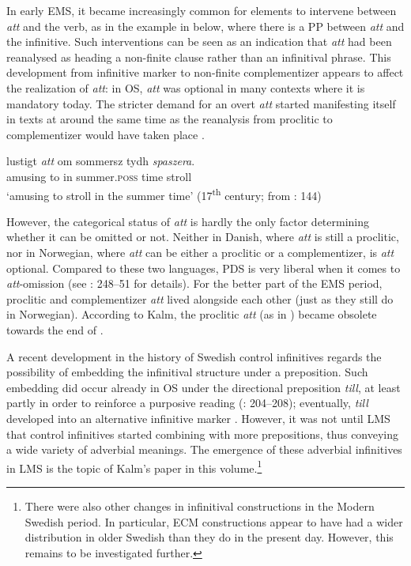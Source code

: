 \documentclass[output=paper]{langscibook}
\begin{document}
In early EMS, it became increasingly common for elements to intervene between \textit{att} and the verb, as in the example in  below, where there is a PP between \textit{att} and the infinitive. Such interventions can be seen as an indication that \textit{att} had been reanalysed as heading a non-finite clause rather than an infinitival phrase. This development from infinitive marker to non-finite complementizer appears to affect the realization of \textit{att}: in OS, \textit{att} was optional in many contexts where it is mandatory today. The stricter demand for an overt \textit{att} started manifesting itself in texts at around the same time as the reanalysis from proclitic to complementizer would have taken place \citep[35]{Falk2010Studier}.


\ea \label{ex:intro:11}
\gll  lustigt \textit{att} om     sommersz     tydh \textit{spaszera}. \\
  amusing  to   in   summer.\textsc{poss}  time  stroll\\
\glt ‘amusing to stroll in the summer time’ (17\textsuperscript{th} century; from \citealt{Kalm2016Satsekvivalenta}: 144)
\z


However, the categorical status of \textit{att} is hardly the only factor determining whether it can be omitted or not. Neither in Danish, where \textit{att} is still a proclitic, nor in Norwegian, where \textit{att} can be either a proclitic or a complementizer, is \textit{att} optional. Compared to these two languages, PDS is very liberal when it comes to \textit{att}{}-omission (see \citealt{Faarlund2019}: 248–51 for details). For the better part of the EMS period, proclitic and complementizer \textit{att} lived alongside each other (just as they still do in Norwegian). According to Kalm, the proclitic \textit{att} (as in ) became obsolete towards the end of \citet[145]{Kalm2016Satsekvivalenta}.



A recent development in the history of Swedish control infinitives regards the possibility of embedding the infinitival structure under a preposition. Such embedding did occur already in OS under the directional preposition \textit{till}, at least partly in order to reinforce a purposive reading (\citealt{Kalm2016Satsekvivalenta}: 204–208); eventually, \textit{till} developed into an alternative infinitive marker \citep[210]{Kalm2016Satsekvivalenta}. However, it was not until LMS that control infinitives started combining with more prepositions, thus conveying a wide variety of adverbial meanings. The emergence of these adverbial infinitives in LMS is the topic of Kalm’s paper in this volume.\footnote{There were also other changes in infinitival constructions in the Modern Swedish period. In particular, ECM constructions appear to have had a wider distribution in older Swedish than they do in the present day. However, this remains to be investigated further.}
\end{document}

